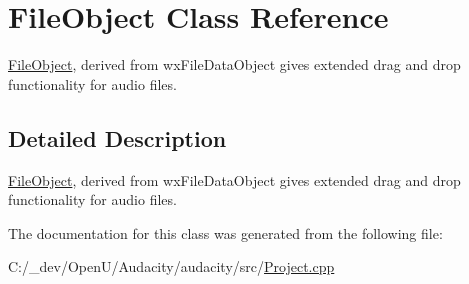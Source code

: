 \hypertarget{class_file_object}{}\section{File\+Object Class Reference}
\label{class_file_object}


\hyperlink{class_file_object}{File\+Object}, derived from wx\+File\+Data\+Object gives extended drag and drop functionality for audio files.  




\subsection{Detailed Description}
\hyperlink{class_file_object}{File\+Object}, derived from wx\+File\+Data\+Object gives extended drag and drop functionality for audio files. 

The documentation for this class was generated from the following file\+:\begin{DoxyCompactItemize}
\item 
C\+:/\+\_\+dev/\+Open\+U/\+Audacity/audacity/src/\hyperlink{_project_8cpp}{Project.\+cpp}\end{DoxyCompactItemize}
